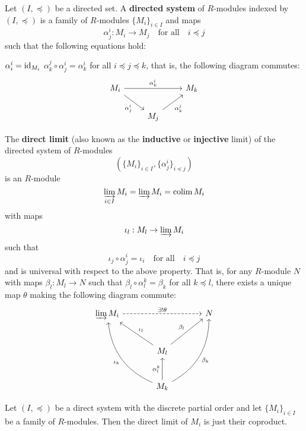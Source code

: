 \begin{defn}[1.13]
	\leavevmode
	\begin{enum}
		\io Let $(I,\preceq)$ be a directed set.
		A \textbf{directed system} of $R$-modules indexed by $(I,\preceq)$ is a family of $R$-modules $\{M_i\}_{i \in I}$ and maps
		\[\alpha_j^i: M_i \to M_j \quad \text{for all} \quad i \preceq j\]
		such that the following equations hold:
		\begin{enum}
			\io $\alpha_i^i= \operatorname{id}_{M_i}$
			\io $\alpha_k^j \circ \alpha_j^i = \alpha_k^i$ for all $i \preceq j \preceq k$, that is, the following diagram commutes:
			\[
			\begin{tikzcd}
				M_i \arrow[rd, "\alpha_j^i"'] \arrow[rr, "\alpha_k^i"] &  & M_k \\
				& M_j \arrow[ru, "\alpha_k^j"'] & 
			\end{tikzcd}
			\]
		\end{enum}
		\io The \textbf{direct limit} (also known as the \textbf{inductive} or \textbf{injective} limit)
		of the directed system of $R$-modules
		\[\left(\{M_i\}_{i \in I}, \{\alpha_j^i\}_{i \preceq j}\right)\]
		is an $R$-module
		\[\varinjlim_{i \in I} M_i = \varinjlim M_i = \operatorname*{colim} M_i\]
		with maps
		\[\iota_l: M_l \to \varinjlim M_i\]
		such that
		\[\iota_j \circ \alpha_j^i = \iota_i \quad \text{for all} \quad i \preceq j\]
		and is universal with respect to the above property.
		That is, for any $R$-module $N$ with maps $\beta_l: M_l \to N$ such that $\beta_l \circ \alpha_l^k=\beta_k$ for all $k \preceq l$, there exists a unique map $\theta$ making the following diagram commute:
		\[
		\begin{tikzcd}[row sep=large, column sep=large]
			\varinjlim M_i \arrow[rr, "\exists !\theta", dashed] & & N \\
			& M_l \arrow[lu, "\iota_l"'] \arrow[ru, "\beta_l"] &  \\
			& M_k \arrow[luu, "\iota_k", bend left] \arrow[ruu, swap, "\beta_k", bend right] \arrow[u, "\alpha_l^k"] & 
		\end{tikzcd}
		\]
	\end{enum}
\end{defn}

\begin{exam}
	Let $(I,\preceq)$ be a direct system with the discrete partial order and let $\{M_i\}_{i \in I}$ be a family of $R$-modules.
	Then the direct limit of $M_i$ is just their coproduct.
\end{exam}
